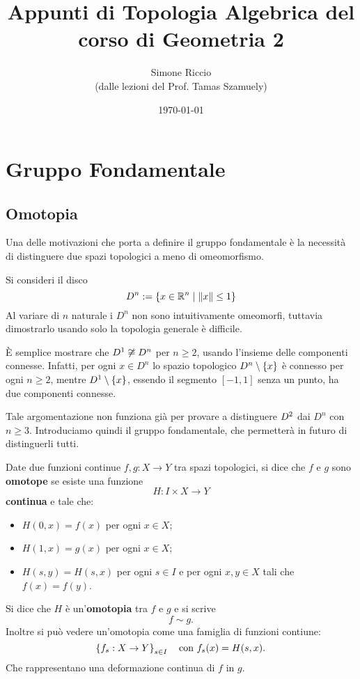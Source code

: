 \documentclass[]{article}
\begin{document}
\title{Appunti di Topologia Algebrica del corso di Geometria 2}
\author{Simone Riccio \\ \small{(dalle lezioni del Prof. Tamas Szamuely)}}
\date{\today}

\maketitle

\tableofcontents

\section{Gruppo Fondamentale}
\subsection{Omotopia}
    Una delle motivazioni che porta a definire il gruppo fondamentale è la necessità di distinguere
    due spazi topologici a meno di omeomorfismo.

    \begin{example} \nl
        Si consideri il disco 
        \[  
            D^n := \left\{  x \in \mathbb{R}^{n} \mid \left\| x \right\| \leq 1  \right\}
        \]
        Al variare di $n$ naturale i $D^n$ non sono intuitivamente omeomorfi, tuttavia dimostrarlo
        usando solo la topologia generale è difficile.

        È semplice mostrare che $D^{1} \not\cong D^n$ per $n \geq 2$, usando l'insieme delle componenti 
        connesse. Infatti, per ogni $x \in D^n$ lo spazio topologico $D^n \setminus \left\{ x \right\}$ è connesso 
        per ogni $n \geq 2$, mentre $D^{1} \setminus \left\{ x \right\}$, essendo il segmento $[-1,1]$ senza un punto, ha due componenti connesse.
    
        Tale argomentazione non funziona già per provare a distinguere $D^{2}$ dai $D^n$ con $n \geq 3$.
        Introduciamo quindi il gruppo fondamentale, che permetterà in futuro di distinguerli tutti.
    \end{example}

    \begin{definition}[Omotopia] \nl
        Date due funzioni continue $f,g: X \to Y$ tra spazi topologici, si dice che $f$ e $g$ sono \textbf{omotope} se esiste una funzione
        \[
            H: I \times X \to Y
        \]
        \textbf{continua} e tale che:
        \begin{itemize}
            \item $H(0,x) = f(x)$ per ogni $x \in X$;
            \item $H(1,x) = g(x)$ per ogni $x \in X$;
            \item $H(s,y) = H(s,x)$ per ogni $s \in I$ e per ogni $x,y \in X$ tali che $f(x) = f(y)$.
        \end{itemize}
        Si dice che $H$ è un'\textbf{omotopia} tra $f$ e $g$ e si scrive
        \[
            f \sim g.
        \]
        Inoltre si pu\`o vedere un'omotopia come una famiglia di funzioni contiune:
        \[
            \left\{ f_s: X \to Y \right\}_{s \in I}
            \quad \text{con } f_s(x) = H(s,x).
        \]
        Che rappresentano una deformazione continua di $f$ in $g$.
    \end{definition}
\end{document}
